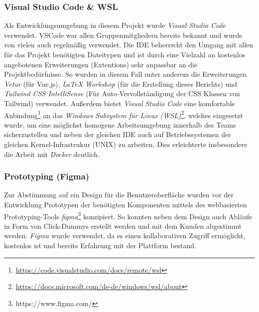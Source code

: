 \documentclass[10pt, a4paper]{article}
\begin{document}
\begin{onehalfspace}
      \subsubsection{Visual Studio Code \& WSL}
      Als Entwicklungsumgebung in diesem Projekt wurde \textit{Visual Studio Code} verwendet. VSCode war allen Gruppenmitgliedern bereits bekannt und wurde von vielen auch regelmäßig verwendet.
      Die IDE beherrscht den Umgang mit allen für das Projekt benötigten Dateitypen und ist durch eine Vielzahl an kostenlos angebotenen Erweiterungen (Extentions) sehr anpassbar an die Projektbedürfnisse.
      So wurden in diesem Fall unter anderem die Erweiterungen \textit{Vetur} (für Vue.js), \textit{LaTeX Workshop}  (für die Erstellung dieses Berichts) und \textit{Tailwind CSS IntelliSense} (Für Auto-Vervollständigung der CSS Klassen von Tailwind) verwendet.
      Außerdem bietet \textit{Visual Studio Code} eine komfortable Anbindung\footnote{\raggedright\url{https://code.visualstudio.com/docs/remote/wsl}} an das
      \textit{Windows Subsystem für Linux (WSL)}\footnote{\raggedright\url{https://docs.microsoft.com/de-de/windows/wsl/about}}, welches eingesetzt wurde, um eine möglichst homogene Arbeitsumgebung innerhalb des Teams sicherzustellen
      und neben der gleichen IDE auch auf Betriebssystemen der gleichen Kernel-Infrastrukur (UNIX) zu arbeiten. Dies erleichterte insbesondere die Arbeit mit \textit{Docker} deutlich.

      \subsubsection{Prototyping (Figma)}
      \label{figma}
      Zur Abstimmung auf ein Design für die Benutzer\-oberfläche wurden vor der Entwicklung Proto\-typen der benötigten Komponenten mittels des webbasierten
      Prototyping-Tools \textit{figma}\footnote{https://www.figma.com/} konzipiert. So konnten neben dem Design auch Abläufe in Form von \glqq Click-Dummys\grqq{} erstellt werden und mit dem Kunden abgestimmt werden.
      \textit{Figma} wurde verwendet, da es einen kollaborativen Zugriff ermöglicht, kostenlos ist und bereits Erfahrung mit der Plattform bestand.


\end{onehalfspace}
\end{document}
